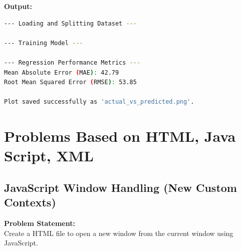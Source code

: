 \documentclass[a4paper,12pt]{article}
\begin{document}
\vspace{0.5cm}
\textbf{Output:}
\begin{lstlisting}[language=bash]
--- Loading and Splitting Dataset ---

--- Training Model ---

--- Regression Performance Metrics ---
Mean Absolute Error (MAE): 42.79
Root Mean Squared Error (RMSE): 53.85

Plot saved successfully as 'actual_vs_predicted.png'.
\end{lstlisting}

\section{Problems Based on HTML, Java Script, XML}

\subsection{JavaScript Window Handling (New Custom Contexts)}
\textbf{Problem Statement:} \\
Create a HTML file to open a new window from the current window using JavaScript.
\end{document}
